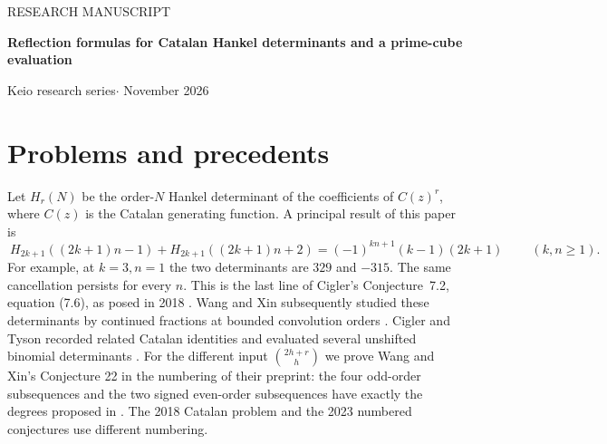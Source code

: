 \documentclass[11pt,a4paper]{article}
\begin{document}
\begin{center}
{\small\sffamily\color{accent} RESEARCH MANUSCRIPT}\par\vspace{7pt}
{\LARGE\bfseries\color{ink} Reflection formulas for Catalan Hankel determinants and a prime-cube evaluation}\par\vspace{7pt}
{\small Keio research series\quad$\cdot$ November 2026}
\end{center}
\begin{abstract}
We prove the five identities of Cigler's 2018 Conjecture 7.2 for every odd convolution power of the Catalan sequence. In the last identity two unbounded-order determinants have a sum of constant absolute value. Reflecting their frequency indices makes all but one column of a Taylor-coefficient determinant agree; a sine subtraction cancels the dependence on the order in the last column. It also determines the full validity range of the companion even conjecture. For the ordinary binomial moments, we prove both parities of Wang and Xin's Conjecture 22 on exact degrees and evaluate the two adjacent sums posed by Cigler in 2018. We compute the signed leading coefficients in Cigler's 2023 Conjectures 8, 9 and 13 by positive moment determinants, determine their least common denominators, correct a Bernoulli sign in Conjecture 14, and classify all five shifted binomial identities of Conjecture 17. An independent arithmetic result gives a congruence modulo $p^3$ for a cubic binomial convolution with a $p$-adic parameter. At parameter $1/4$ it gives a counterexample to one clause of Sun's Conjecture 35(v) for every prime $p>3$ congruent to $3$ modulo $8$.
\end{abstract}

\section{Problems and precedents}
Let $H_r(N)$ be the order-$N$ Hankel determinant of the coefficients of $C(z)^r$, where $C(z)$ is the Catalan generating function. A principal result of this paper is
\[
 \boxed{\ H_{2k+1}((2k+1)n-1)+H_{2k+1}((2k+1)n+2)
      =(-1)^{kn+1}(k-1)(2k+1)\ }\qquad(k,n\ge1).
\]
For example, at $k=3,n=1$ the two determinants are $329$ and $-315$. The same cancellation persists for every $n$. This is the last line of Cigler's Conjecture~7.2, equation (7.6), as posed in 2018 \cite{C18}. Wang and Xin subsequently studied these determinants by continued fractions at bounded convolution orders \cite{WX}. Cigler and Tyson recorded related Catalan identities and evaluated several unshifted binomial determinants \cite{CT}. For the different input $\binom{2h+r}{h}$ we prove Wang and Xin's Conjecture 22 in the numbering of their preprint: the four odd-order subsequences and the two signed even-order subsequences have exactly the degrees proposed in \cite{WX}. The 2018 Catalan problem and the 2023 numbered conjectures \cite{C23} use different numbering.
\end{document}
